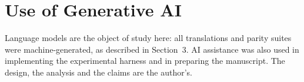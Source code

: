 \documentclass[sigconf]{acmart}
\begin{document}
\section*{Use of Generative AI}

Language models are the object of study here: all translations and parity suites were
machine-generated, as described in Section~3. AI assistance was also used in implementing the
experimental harness and in preparing the manuscript. The design, the analysis and the claims
are the author's.

\balance


\end{document}
